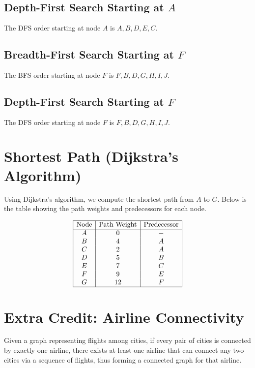 \documentclass[10pt]{article}
\begin{document}
\subsection{Depth-First Search Starting at \( A \)}
The DFS order starting at node \( A \) is \( A, B, D, E, C \).

\subsection{Breadth-First Search Starting at \( F \)}
The BFS order starting at node \( F \) is \( F, B, D, G, H, I, J \).

\subsection{Depth-First Search Starting at \( F \)}
The DFS order starting at node \( F \) is \( F, B, D, G, H, I, J \).

\newpage

\section{Shortest Path (Dijkstra's Algorithm)}

Using Dijkstra's algorithm, we compute the shortest path from \( A \) to \( G \). Below is the table showing the path weights and predecessors for each node.

\[
\begin{array}{|c|c|c|}
    \hline
    \text{Node} & \text{Path Weight} & \text{Predecessor} \\
    \hline
    A & 0 & - \\ 
    B & 4 & A \\ 
    C & 2 & A \\ 
    D & 5 & B \\ 
    E & 7 & C \\ 
    F & 9 & E \\ 
    G & 12 & F \\ 
    \hline
\end{array}
\]

\newpage

\section{Extra Credit: Airline Connectivity}

Given a graph representing flights among cities, if every pair of cities is connected by exactly one airline, there exists at least one airline that can connect any two cities via a sequence of flights, thus forming a connected graph for that airline.
\end{document}
